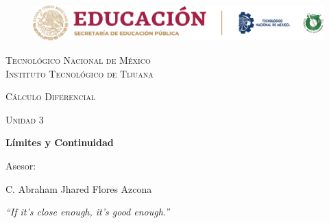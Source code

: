 \documentclass[letterpaper, 12pt]{article}
\begin{document}
    
    \begin{titlepage}
        \begin{figure}[ht]
            \centering
            \includegraphics[width=15cm]{logosITT.png}
        \end{figure}
        \centering
        {\scshape\LARGE Tecnológico Nacional de México\\Instituto Tecnológico de Tijuana\par}
        \vspace{1cm}
        {\scshape\Large Cálculo Diferencial\par}
        \vspace{1cm}
        {\scshape\Large Unidad 3\par}
        \vspace{1.5cm}
        {\huge\bfseries Límites y Continuidad\par}
        \vfill
        Asesor: \par
        C. Abraham Jhared Flores Azcona
        
        \vfill

        {\large \emph{``If it's close enough, it's good enough.''}}


    \end{titlepage}

    \newpage
    \thispagestyle{empty}
    \tableofcontents

    \newpage
    \pagestyle{fancy}
\end{document}
